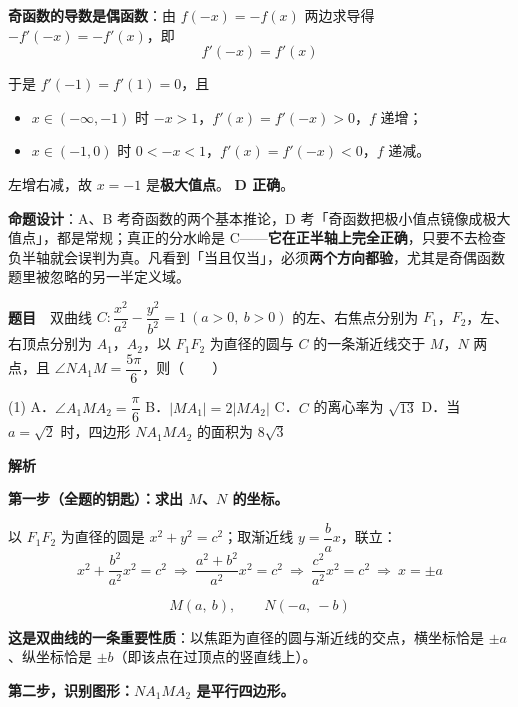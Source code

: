 \textbf{奇函数的导数是偶函数}：由 $f(-x)=-f(x)$ 两边求导得 $-f'(-x)=-f'(x)$，即
\[f'(-x)=f'(x)\]

于是 $f'(-1)=f'(1)=0$，且
\begin{itemize}
\item $x\in(-\infty,-1)$ 时 $-x>1$，$f'(x)=f'(-x)>0$，$f$ 递增；
\item $x\in(-1,0)$ 时 $0<-x<1$，$f'(x)=f'(-x)<0$，$f$ 递减。
\end{itemize}

左增右减，故 $x=-1$ 是\textbf{极大值点}。 \textbf{D 正确}。


\begin{gktip}
\textbf{命题设计}：A、B 考奇函数的两个基本推论，D 考「奇函数把极小值点镜像成极大值点」，都是常规；真正的分水岭是 C——\textbf{它在正半轴上完全正确}，只要不去检查负半轴就会误判为真。凡看到「当且仅当」，必须\textbf{两个方向都验}，尤其是奇偶函数题里被忽略的另一半定义域。
\end{gktip}

\par\medskip


\textbf{题目}　双曲线 $C:\dfrac{x^2}{a^2}-\dfrac{y^2}{b^2}=1\ (a>0,\ b>0)$ 的左、右焦点分别为 $F_1$，$F_2$，左、右顶点分别为 $A_1$，$A_2$，以 $F_1F_2$ 为直径的圆与 $C$ 的一条渐近线交于 $M$，$N$ 两点，且 $\angle NA_1M=\dfrac{5\pi}{6}$，则（　　）

\begin{gkopts}(1)
\task A．$\angle A_1MA_2=\dfrac{\pi}{6}$
\task B．$|MA_1|=2|MA_2|$
\task C．$C$ 的离心率为 $\sqrt{13}$
\task D．当 $a=\sqrt2$ 时，四边形 $NA_1MA_2$ 的面积为 $8\sqrt3$
\end{gkopts}

\textbf{解析}

\textbf{第一步（全题的钥匙）：求出 $M$、$N$ 的坐标。}

以 $F_1F_2$ 为直径的圆是 $x^2+y^2=c^2$；取渐近线 $y=\dfrac bax$，联立：
\[x^2+\frac{b^2}{a^2}x^2=c^2\ \Longrightarrow\ \frac{a^2+b^2}{a^2}x^2=c^2\ \Longrightarrow\ \frac{c^2}{a^2}x^2=c^2\ \Longrightarrow\ x=\pm a\]

\[M(a,\ b),\qquad N(-a,\ -b)\]

\textbf{这是双曲线的一条重要性质}：以焦距为直径的圆与渐近线的交点，横坐标恰是 $\pm a$、纵坐标恰是 $\pm b$（即该点在过顶点的竖直线上）。

\textbf{第二步，识别图形：$NA_1MA_2$ 是平行四边形。}

